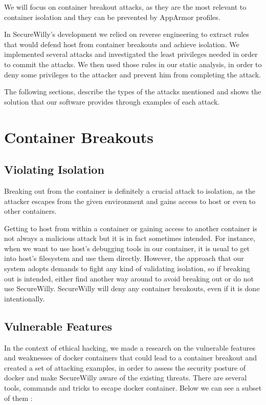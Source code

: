 We will focus on container breakout attacks, as they are the most relevant to container isolation and they can be prevented by AppArmor profiles.

In SecureWilly's development we relied on reverse engineering to extract rules that would defend host from container breakouts and achieve isolation. We implemented several attacks and investigated the least privileges needed in order to commit the attacks. We then used those rules in our static analysis, in order to deny some privileges to the attacker and prevent him from completing the attack.

The following sections, describe the types of the attacks mentioned and shows the solution that our software provides through examples of each attack.

\section{Container Breakouts}
\subsection{Violating Isolation}
Breaking out from the container is definitely a crucial attack to isolation, as the attacker escapes from the given environment and gains access to host or even to other containers.

Getting to host from within a container or gaining access to another container is not always a malicious attack but it is in fact sometimes intended. For instance, when we want to use host's debugging tools in our container, it is usual to get into host's filesystem and use them directly.
However, the approach that our system adopts demands to fight any kind of validating isolation, so if breaking out is intended, either find another way around to avoid breaking out or do not use SecureWilly. SecureWilly will deny any container breakouts, even if it is done intentionally.

\subsection{Vulnerable Features}
In the context of ethical hacking, we made a research on the vulnerable features and weaknesses of docker containers that could lead to a container breakout and created a set of attacking examples, in order to assess the security posture of docker and make SecureWilly aware of the existing threats.
There are several tools, commands and tricks to escape docker container. Below we can see a subset of them \cite{onentryattacks}: 

